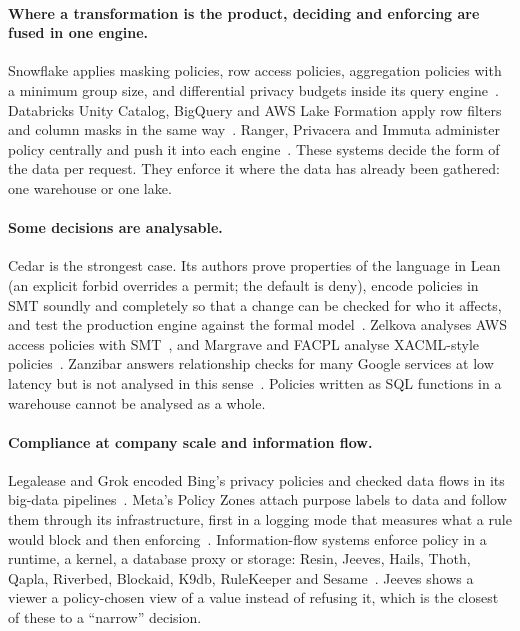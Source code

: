 \paragraph{Where a transformation is the product, deciding and enforcing are
fused in one engine.} Snowflake applies masking policies, row access policies,
aggregation policies with a minimum group size, and differential privacy
budgets inside its query
engine~\citep{snowflake2026masking,snowflake2026rowaccess,snowflake2026aggregation,snowflake2026dp}.
Databricks Unity Catalog, BigQuery and AWS Lake Formation apply row filters and
column masks in the same
way~\citep{databricks2026filters,google2026bqmasking,aws2026lakeformation}.
Ranger, Privacera and Immuta administer policy centrally and push it into each
engine~\citep{privacera2026ranger,immuta2026purposes}. These systems decide the
form of the data per request. They enforce it where the data has already been
gathered: one warehouse or one lake.

\paragraph{Some decisions are analysable.} Cedar is the strongest case. Its
authors prove properties of the language in Lean (an explicit forbid overrides a
permit; the default is deny), encode policies in SMT soundly and completely so
that a change can be checked for who it affects, and test the production engine
against the formal model~\citep{cutler2024cedar,disselkoen2024how}. Zelkova
analyses AWS access policies with SMT~\citep{backes2018semantic}, and Margrave
and FACPL analyse XACML-style policies~\citep{fisler2005verification,margheri2019rigorous}.
Zanzibar answers relationship checks for many Google services at low latency
but is not analysed in this sense~\citep{pang2019zanzibar}. Policies written as
SQL functions in a warehouse cannot be analysed as a whole.

\paragraph{Compliance at company scale and information flow.} Legalease and
Grok encoded Bing's privacy policies and checked data flows in its big-data
pipelines~\citep{sen2014bootstrapping}. Meta's Policy Zones attach purpose
labels to data and follow them through its infrastructure, first in a logging
mode that measures what a rule would block and then
enforcing~\citep{meta2024purpose,meta2025policyzones}. Information-flow systems
enforce policy in a runtime, a kernel, a database proxy or storage: Resin,
Jeeves, Hails, Thoth, Qapla, Riverbed, Blockaid, K9db, RuleKeeper and
Sesame~\citep{yip2009improving,yang2012language,giffin2012hails,elnikety2016thoth,mehta2017qapla,wang2019riverbed,zhang2022blockaid,albab2023k9db,ferreira2023rulekeeper,albab2024sesame}.
Jeeves shows a viewer a policy-chosen view of a value instead of refusing it,
which is the closest of these to a ``narrow'' decision.


